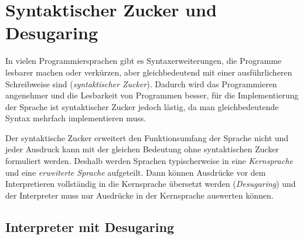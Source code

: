 \documentclass[]{article}
\begin{document}
\hypertarget{syntaktischer-zucker-und-desugaring}{%
\section{Syntaktischer Zucker und
Desugaring}\label{syntaktischer-zucker-und-desugaring}}

In vielen Programmiersprachen gibt es Syntaxerweiterungen, die Programme
lesbarer machen oder verkürzen, aber gleichbedeutend mit einer
ausführlicheren Schreibweise sind (\emph{syntaktischer Zucker}). Dadurch
wird das Programmieren angenehmer und die Lesbarkeit von Programmen
besser, für die Implementierung der Sprache ist syntaktischer Zucker
jedoch lästig, da man gleichbedeutende Syntax mehrfach implementieren
muss.

Der syntaktische Zucker erweitert den Funktionsumfang der Sprache nicht
und jeder Ausdruck kann mit der gleichen Bedeutung ohne syntaktischen
Zucker formuliert werden. Deshalb werden Sprachen typischerweise in eine
\emph{Kernsprache} und eine \emph{erweiterte Sprache} aufgeteilt. Dann
können Ausdrücke vor dem Interpretieren vollständig in die Kernsprache
übersetzt werden (\emph{Desugaring}) und der Interpreter muss nur
Ausdrücke in der Kernsprache auswerten können.

\hypertarget{interpreter-mit-desugaring}{%
\subsection{Interpreter mit
Desugaring}\label{interpreter-mit-desugaring}}
\end{document}
